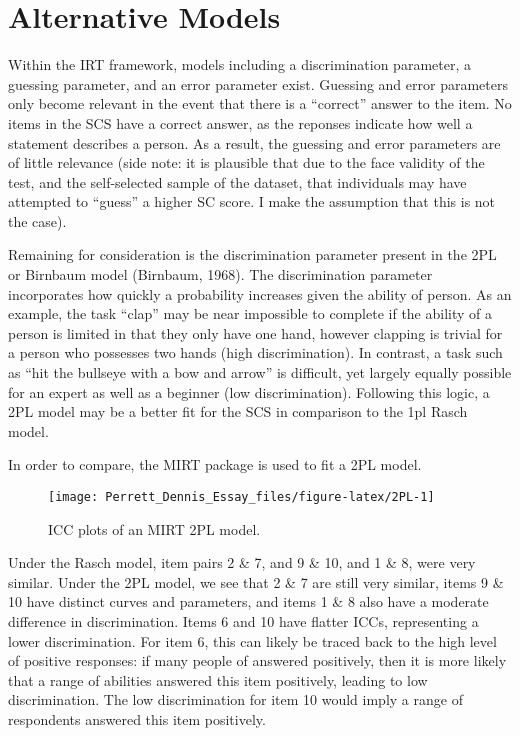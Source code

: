 \documentclass[
  man,floatsintext]{apa6}
\begin{document}
\hypertarget{alternative-models}{%
\section{Alternative Models}\label{alternative-models}}

Within the IRT framework, models including a discrimination parameter, a guessing parameter, and an error parameter exist. Guessing and error parameters only become relevant in the event that there is a ``correct'' answer to the item. No items in the SCS have a correct answer, as the reponses indicate how well a statement describes a person. As a result, the guessing and error parameters are of little relevance (side note: it is plausible that due to the face validity of the test, and the self-selected sample of the dataset, that individuals may have attempted to ``guess'' a higher SC score. I make the assumption that this is not the case).

Remaining for consideration is the discrimination parameter present in the 2PL or Birnbaum model (Birnbaum, 1968). The discrimination parameter incorporates how quickly a probability increases given the ability of person. As an example, the task ``clap'' may be near impossible to complete if the ability of a person is limited in that they only have one hand, however clapping is trivial for a person who possesses two hands (high discrimination). In contrast, a task such as ``hit the bullseye with a bow and arrow'' is difficult, yet largely equally possible for an expert as well as a beginner (low discrimination). Following this logic, a 2PL model may be a better fit for the SCS in comparison to the 1pl Rasch model.

In order to compare, the MIRT package is used to fit a 2PL model.

\begin{figure}

{\centering \texttt{[image: Perrett\_Dennis\_Essay\_files/figure-latex/2PL-1]} 

}

\caption{ICC plots of an MIRT 2PL model.}\label{fig:2PL}
\end{figure}

Under the Rasch model, item pairs 2 \& 7, and 9 \& 10, and 1 \& 8, were very similar. Under the 2PL model, we see that 2 \& 7 are still very similar, items 9 \& 10 have distinct curves and parameters, and items 1 \& 8 also have a moderate difference in discrimination. Items 6 and 10 have flatter ICCs, representing a lower discrimination. For item 6, this can likely be traced back to the high level of positive responses: if many people of answered positively, then it is more likely that a range of abilities answered this item positively, leading to low discrimination. The low discrimination for item 10 would imply a range of respondents answered this item positively.
\end{document}
